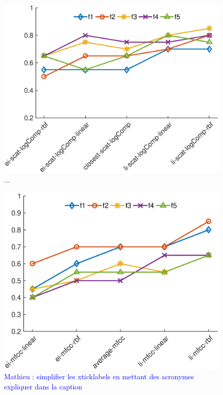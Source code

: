 \documentclass[journal]{IEEEtran}
\newcommand{\ml}[1]{\textcolor{blue}{ Mathieu : #1}}
\begin{document}
\begin{figure}
\begin{center}
\includegraphics[width=\columnwidth]{gfx/supervised_linear_test1.eps}
\caption{...}
\end{center}
\end{figure}

\begin{figure}
\begin{center}
\includegraphics[width=\columnwidth]{gfx/supervised_rbf_test2.eps}
\caption{\ml{simplifier les xticklabels en mettant des acronymes expliquer dans la caption}}
\end{center}
\end{figure}
\end{document}
